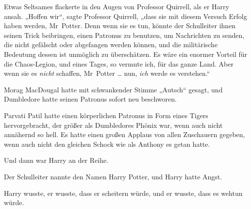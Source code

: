 Etwas Seltsames flackerte in den Augen von Professor Quirrell, als er Harry ansah.
„Hoffen wir“, sagte Professor Quirrell, „dass sie mit diesem Versuch Erfolg haben werden, Mr~Potter. Denn wenn sie es tun, könnte der Schulleiter ihnen seinen Trick beibringen, einen Patronus zu benutzen, um Nachrichten zu senden, die nicht gefälscht oder abgefangen werden können, und die militärische Bedeutung dessen ist unmöglich zu überschätzen. Es wäre ein enormer Vorteil für die Chaos-Legion, und eines Tages, so vermute ich, für das ganze Land. Aber wenn sie es \emph{nicht} schaffen, Mr~Potter … nun, \emph{ich} werde es verstehen.“

\later

Morag MacDougal hatte mit schwankender Stimme
„Autsch“ gesagt, und Dumbledore hatte seinen Patronus sofort neu beschworen.

Parvati Patil hatte einen körperlichen Patronus in Form eines Tigers hervorgebracht, der größer als Dumbledores Phönix war, wenn auch nicht annähernd so hell. Es hatte einen großen Applaus von allen Zuschauern gegeben, wenn auch nicht den gleichen Schock wie als Anthony es getan hatte.

Und dann war Harry an der Reihe.

Der Schulleiter nannte den Namen Harry Potter, und Harry hatte Angst.

Harry wusste, er wusste, dass er scheitern würde, und er wusste, dass es wehtun würde.

